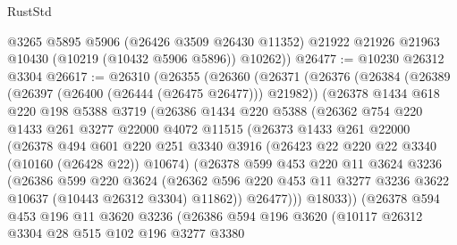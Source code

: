 \begin{lexlean}{RustStd}
\begin{coremodule}
        @3265
        @5895
        @5906
        (@26426 @3509 @26430 @11352)
        @21922
        @21926
        @21963
        @10430
        (@10219 (@10432 @5906 @5896))
        @10262))
@26477 := @10230 @26312 @3304
@26617 := @26310
    (@26355
      (@26360
        (@26371
          (@26376
            (@26384
              (@26389 (@26397 (@26400 (@26444 (@26475 @26477))) @21982))
              (@26378
                @1434
                @618
                @220
                @198
                @5388
                @3719
                (@26386
                  @1434
                  @220
                  @5388
                  (@26362
                    @754
                    @220
                    @1433
                    @261
                    @3277
                    @22000
                    @4072
                    @11515
                    (@26373
                      @1433
                      @261
                      @22000
                      (@26378
                        @494
                        @601
                        @220
                        @251
                        @3340
                        @3916
                        (@26423 @22 @220 @22 @3340 (@10160 (@26428 @22)) @10674)
                        (@26378
                          @599
                          @453
                          @220
                          @11
                          @3624
                          @3236
                          (@26386
                            @599
                            @220
                            @3624
                            (@26362
                              @596
                              @220
                              @453
                              @11
                              @3277
                              @3236
                              @3622
                              @10637
                              (@10443 @26312 @3304)
                              @11862))
                          @26477)))
                    @18033))
                (@26378
                  @594
                  @453
                  @196
                  @11
                  @3620
                  @3236
                  (@26386
                    @594
                    @196
                    @3620
                    (@10117
                      @26312
                      @3304
                      @28
                      @515
                      @102
                      @196
                      @3277
                      @3380

\end{coremodule}
\end{lexlean}
